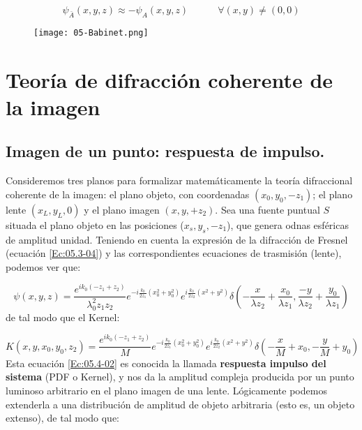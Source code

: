 \documentclass[12pt,a4paper]{book}
\numberwithin{equation}{section}
\numberwithin{figure}{section}
\newcommand{\tquad}{\quad \quad \quad}
\newcommand{\parentesis}[1]{\left( #1  \right)}
\newcommand{\1}{_{(1)}}
\newcommand{\2}{_{(2)}}
\theoremstyle{definition}
\begin{document}
\begin{equation}
    \psi_{\bar{A}} (x,y,z) \approx - \psi_A(x,y,z) \tquad \forall (x,y) \neq (0,0)
\end{equation}

\begin{figure}[h!]
    \centering
    \texttt{[image: 05-Babinet.png]}
    \caption{}
    \label{Fig:05.03}
\end{figure}


\section{Teoría de difracción coherente de la imagen}



\subsection{Imagen de un punto: respuesta de impulso.}

Consideremos tres planos para formalizar matemáticamente la teoría difraccional coherente de la imagen: el plano objeto, con coordenadas $(x_0,y_0,-z_1)$; el plano lente $(x_L,y_L,0)$ y el plano imagen $(x,y,+z_2)$. Sea una fuente puntual $S$ situada el plano objeto en las posiciones ($x_s,y_s,-z_1$), que genera odnas esféricas de amplitud unidad. Teniendo en cuenta la expresión de la difracción de Fresnel (ecuación \ref{Ec:05.3-04}) y las correspondientes ecuaciones de trasmisión (lente), podemos ver que:

\begin{equation}
    \psi (x,y,z) = \frac{e^{ik_0(-z_1+z_2)}}{\lambda_0^2 z_1 z_2} e^{-i \frac{k_0}{2z_1} (x_0^2 + y_0^2)} e^{i \frac{k_0}{2z_2}(x^2+y^2)} \delta \parentesis{-\frac{x}{\lambda z_2}+\frac{x_0}{\lambda z_1}, \frac{-y}{\lambda z_2} + \frac{y_0}{\lambda z_1}}
\end{equation}
de tal modo que el Kernel:

\begin{equation}
    K(x,y,x_0,y_0,z_2) = \frac{e^{ik_0(-z_1+z_2)}}{M} e^{-i\frac{k_0}{2z_1} (x_0^2+y_0^2)} e^{i \frac{k_0}{2z_2}(x^2+y^2)} \delta\parentesis{-\frac{x}{M}+x_0, - \frac{y}{M}+y_0} \label{Ec:05.4-02}
\end{equation}
Esta ecuación \ref{Ec:05.4-02} es conocida la llamada \textbf{respuesta impulso del sistema} (PDF o Kernel), y nos da la amplitud compleja producida por un punto luminoso arbitrario en el plano imagen de una lente. Lógicamente podemos extenderla a una distribución de amplitud de objeto arbitraria (esto es, un objeto extenso), de tal modo que:
\end{document}
